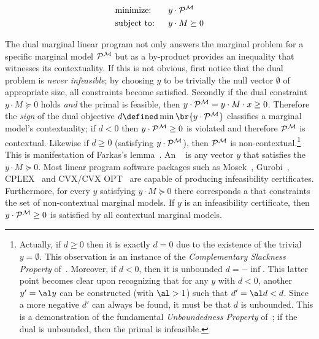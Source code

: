 \documentclass[aps, 10pt, english, twoside, pra, nofootinbib, tightenlines, longbibliography, superscriptaddress]{revtex4-1}
\begin{document}
    \begin{alignat*}{2}
        & \text{minimize:} \quad&& y \cdot \probvec^{\mscenario}\\
        & \text{subject to:} && y \cdot M \succeq 0
    \end{alignat*}

    The dual marginal linear program not only answers the marginal problem for a specific marginal model $\probvec^{\mscenario}$ but as a by-product provides an inequality that witnesses its contextuality. If this is not obvious, first notice that the dual problem is \textit{never infeasible}; by choosing $y$ to be trivially the null vector $\emptyset$ of appropriate size, all constraints become satisfied. Secondly if the dual constraint $y \cdot M \succeq 0$ holds \textit{and} the primal is feasible, then $y \cdot \probvec^{\mscenario} =  y \cdot M \cdot x \geq 0$. Therefore the \textit{sign} of the dual objective $d \defined \min \br{y \cdot \probvec^{\mscenario}}$ classifies a marginal model's contextuality; if $d < 0$ then $y \cdot \probvec^{\mscenario} \geq 0$ is violated and therefore $\probvec^{\mscenario}$ is contextual. Likewise if $d \geq 0$ (satisfying $y \cdot \probvec^{\mscenario}$), then $\probvec^{\mscenario}$ is non-contextual.\footnote{Actually, if $d \geq 0$ then it is exactly $d = 0$ due to the existence of the trivial $y = \emptyset$. This observation is an instance of the \textit{Complementary Slackness Property} of~\cite{Bradley_1977}. Moreover, if $d < 0$, then it is unbounded $d = -\inf$. This latter point becomes clear upon recognizing that for any $y$ with $d < 0$, another $y' = \al y$ can be constructed (with $\al > 1$) such that $d' = \al d < d$. Since a more negative $d'$ can always be found, it must be that $d$ is unbounded. This is a demonstration of the fundamental \textit{Unboundedness Property} of~\cite{Bradley_1977}; if the dual is unbounded, then the primal is infeasible.} This is manifestation of Farkas's lemma~\cite{Schrijver_1998}. An ~\cite{Andersen_2001} is any vector $y$ that satisfies the $y \cdot M \succeq 0$. Most linear program software packages such as Mosek~\cite{Mosek_2016}, Gurobi~\cite{Gurobi_2016}, CPLEX~\cite{Cplex_2016} and CVX/CVX OPT~\cite{CVX_2016,CVX_Opt_2016} are capable of producing infeasibility certificates. Furthermore, for every $y$ satisfying $y \cdot M \succeq 0$ there corresponds a  that constraints the set of non-contextual marginal models. If $y$ is an infeasibility certificate, then $y \cdot \probvec^{\mscenario} \geq 0$ is satisfied by all contextual marginal models.
\end{document}
